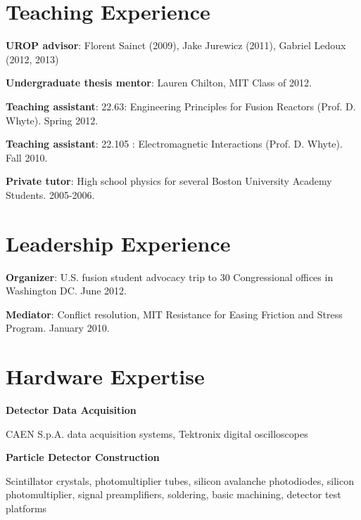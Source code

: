 \documentclass[10pt]{article}
\begin{document}
\section{Teaching Experience}
\begin{innerlist}
\item \textbf{UROP advisor}: Florent Sainct (2009), Jake Jurewicz (2011), Gabriel Ledoux (2012, 2013)
\item \textbf{Undergraduate thesis mentor}: Lauren Chilton, MIT Class of 2012.
\item \textbf{Teaching assistant}: 22.63: Engineering Principles for Fusion Reactors (Prof. D. Whyte). Spring 2012.
\item \textbf{Teaching assistant}: 22.105 : Electromagnetic Interactions (Prof. D. Whyte). Fall 2010.
\item \textbf{Private tutor}: High school physics for several Boston University Academy Students. 2005-2006. 
\end{innerlist}

\section{Leadership Experience}
\begin{innerlist}
\item \textbf{Organizer}: U.S. fusion student advocacy trip to 30 Congressional offices in Washington DC. June 2012.
\item \textbf{Mediator}: Conflict resolution, MIT Resistance for Easing Friction and Stress Program. January 2010.
\end{innerlist}

\section{Hardware Expertise}
\textbf{Detector Data Acquisition}
\begin{innerlist}
  \item CAEN S.p.A. data acquisition systems, Tektronix digital oscilloscopes
\end{innerlist}

\halfblankline

\textbf{Particle Detector Construction}
\begin{innerlist}
\item Scintillator crystals, photomultiplier tubes, silicon avalanche
  photodiodes, silicon photomultiplier, signal preamplifiers,
  soldering, basic machining, detector test platforms
\end{innerlist}
\end{document}

